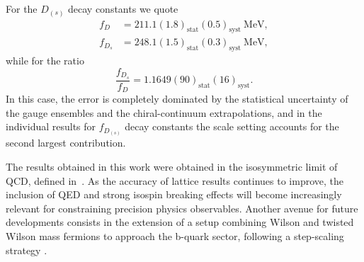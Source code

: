 For the $D_{(s)}$ decay constants we quote
\begin{align}
	f_D &= 211.1(1.8)_{\textrm{stat}}(0.5)_{\textrm{syst}} \ \mathrm{MeV},
	\\
	f_{D_s} &= 248.1(1.5)_{\textrm{stat}}(0.3)_{\textrm{syst}} \ \mathrm{MeV},
\end{align}
while for the ratio
\begin{equation}
	\frac{f_{D_s}}{f_D} = 1.1649(90)_{\textrm{stat}}(16)_{\textrm{syst}}.
\end{equation}
In this case, the error is completely dominated by the statistical uncertainty of the gauge ensembles and the chiral-continuum extrapolations, and in the individual results for $f_{D_{(s)}}$ decay constants the scale setting accounts for the second largest contribution.

The results obtained in this work were obtained in the isosymmetric limit of QCD, defined in~\citep{FlavourLatticeAveragingGroupFLAG:2021npn}. As the accuracy of lattice results continues to improve, the inclusion of QED and strong isospin breaking effects will become increasingly relevant for constraining precision physics observables. Another avenue for future developments consists in the extension of a setup combining Wilson and twisted Wilson mass fermions to approach  the b-quark sector, following a step-scaling strategy \cite{Sommer:2023gap}.


